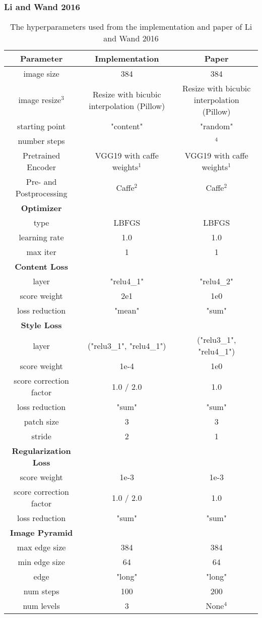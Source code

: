 \subsubsection{Li and Wand 2016}
\begin{landscape}
	\begin{table*}[!t]
		\renewcommand{\arraystretch}{1.0}
		\caption{The hyperparameters used from the implementation and paper of Li and Wand 2016 \cite{LW2016}}
		\label{tab:LW2016_parameters}
		\centering
		\begin{tabular}{c|c|c}
			\hline
			\bfseries Parameter & \bfseries Implementation & \bfseries Paper\\
			\hline\hline
			image size & 384 & 384 \\
			image resize$^3$ & Resize with bicubic interpolation (Pillow) & Resize with bicubic interpolation (Pillow)\\
			starting point & "content"  & "random" \\
			number steps &  & $^4$ \\
			Pretrained Encoder & VGG19 with caffe weights$^1$ & VGG19 with caffe weights$^1$ \\
			Pre- and Postprocessing & Caffe$^2$ & Caffe$^2$\\
			\hline
			\bfseries Optimizer & &\\
			\hline
			type & LBFGS & LBFGS \\
			learning rate & 1.0 & 1.0 \\
			max iter & 1 & 1 \\
			\hline
			\bfseries  Content Loss & & \\
			\hline
			layer & "relu4\_1" & "relu4\_2" \\
			score weight & 2e1 & 1e0 \\
			loss reduction & "mean" & "sum" \\
			\hline
			\bfseries  Style Loss & & \\
			\hline
			layer & ("relu3\_1", "relu4\_1") & ("relu3\_1", "relu4\_1") \\
			score weight & 1e-4 & 1e0 \\
			score correction factor & 1.0 / 2.0 & 1.0 \\
			loss reduction & "sum" & "sum" \\
			patch size & 3 & 3\\
			stride & 2 & 1\\
			\hline
			\bfseries  Regularization Loss & & \\
			\hline
			score weight & 1e-3 & 1e-3 \\
			score correction factor & 1.0 / 2.0 & 1.0 \\
			loss reduction & "sum" & "sum" \\
			\hline
			\bfseries  Image Pyramid & & \\
			\hline
			max edge size & 384 & 384 \\
			min edge size & 64 & 64 \\
			edge & "long" & "long" \\
			num steps & 100 & 200 \\
			num levels & 3 & None$^4$ \\
			 

\end{tabular}
\end{table*}
\end{landscape}
